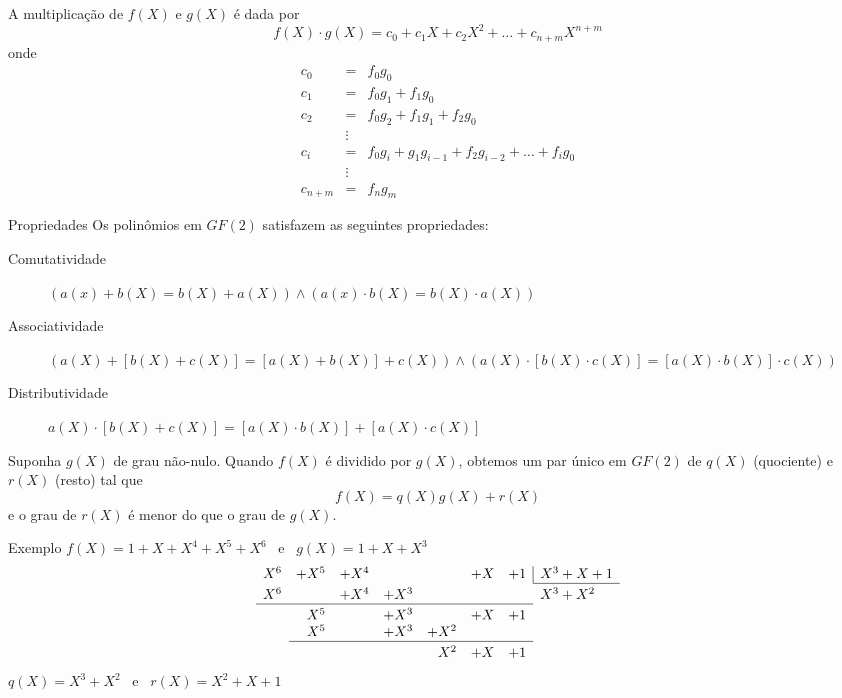 \begin{frame}[allowframebreaks]
  \framebreak
  A multiplicação de $f(X)$ e $g(X)$ é dada por
  \begin{equation}
    f(X) \cdot g(X) = c_0 + c_1 X + c_2 X^2 + \ldots + c_{n+m} X^{n+m}
  \end{equation}
  onde
  \begin{eqnarray}
    c_0 &=& f_0 g_0 \nonumber\\
    c_1 &=& f_0 g_1 + f_1 g_0 \nonumber\\
    c_2 &=& f_0 g_2 + f_1 g_1 + f_2 g_0 \nonumber\\
        &\vdots& \nonumber\\
    c_i &=& f_0 g_i + g_1 g_{i-1} + f_2 g_{i-2} + \ldots + f_i g_0 \nonumber\\
        &\vdots& \nonumber\\
    c_{n+m} &=& f_n g_m
  \end{eqnarray}

  \framebreak
  \begin{block}{Propriedades}
    Os polinômios em $GF(2)$ satisfazem as seguintes propriedades:
    \begin{description}
      \item[Comutatividade] $(a(x) + b(X) = b(X) + a(X)) \land (a(x) \cdot b(X) = b(X) \cdot a(X))$
      \item[Associatividade] $\left(a(X) + [b(X) + c(X)] = [a(X) + b(X)] + c(X)\right) \land \left(a(X) \cdot [b(X) \cdot c(X)] = [a(X) \cdot b(X)] \cdot c(X)\right)$
      \item[Distributividade] $a(X) \cdot [b(X) + c(X)] = [a(X) \cdot b(X)] + [a(X) \cdot c(X)]$
    \end{description}
  \end{block}

  \framebreak
  Suponha $g(X)$ de grau não-nulo. Quando $f(X)$ é dividido por $g(X)$, obtemos um par único em $GF(2)$ de $q(X)$ (quociente) e $r(X)$ (resto) tal que
  \begin{equation}
    f(X) = q(X) g(X) + r(X)
  \end{equation}
  e o grau de $r(X)$ é menor do que o grau de $g(X)$.

  \framebreak
  \begin{block}{Exemplo}
    $f(X) = 1 + X + X^4 + X^5 + X^6$ \ e \ $g(X) = 1 + X + X^3$
    \[
      \begin{array}{rrrrrrrl}
        X^6 &+ X^5 &+ X^4 &&&+ X &+ 1 & \multicolumn{1}{| l}{X^3 + X + 1} \\
        \cline{8-8}
        \rule{0pt}{2.6ex}
        X^6 &&+ X^4 &+ X^3 &&& & X^3 + X^2 \\
        \cline{1-7}
        \rule{0pt}{2.6ex}
         & X^5 &&+ X^3 &&+ X &+ 1 & \\
         & X^5 &&+ X^3 &+ X^2 &&& \\
        \cline{2-7}
        \rule{0pt}{2.6ex}
         &&&& X^2 &+ X &+ 1 &
      \end{array}
    \]
    $q(X) = X^3 + X^2$ \ e \ $r(X) = X^2 + X + 1$
  \end{block}


\end{frame}
